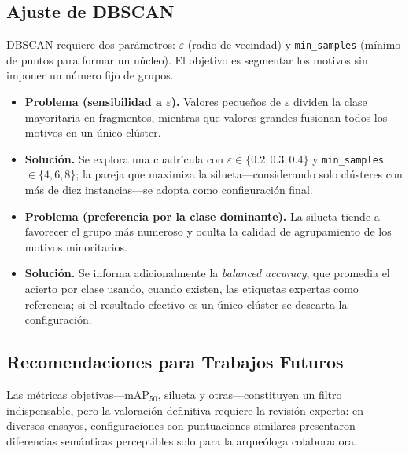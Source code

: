 \subsection{Ajuste de DBSCAN}\label{ssec:dbscan}

DBSCAN requiere dos parámetros: \(\varepsilon\) (radio de vecindad) y \texttt{min\_samples} (mínimo de puntos para formar un núcleo).
El objetivo es segmentar los motivos sin imponer un número fijo de grupos.

\begin{itemize}
  \item \textbf{Problema (sensibilidad a \(\varepsilon\)).}
        Valores pequeños de \(\varepsilon\) dividen la clase mayoritaria en fragmentos, mientras que valores grandes fusionan todos los motivos en un único clúster.
  \item \textbf{Solución.}
        Se explora una cuadrícula con \(\varepsilon\in\{0.2,0.3,0.4\}\) y \texttt{min\_samples}\(\in\{4,6,8\}\); la pareja que maximiza la silueta—considerando solo clústeres con más de diez instancias—se adopta como configuración final.

  \item \textbf{Problema (preferencia por la clase dominante).}
        La silueta tiende a favorecer el grupo más numeroso y oculta la calidad de agrupamiento de los motivos minoritarios.
  \item \textbf{Solución.}
        Se informa adicionalmente la \emph{balanced accuracy}, que promedia el acierto por clase usando, cuando existen, las etiquetas expertas como referencia; si el resultado efectivo es un único clúster se descarta la configuración.
\end{itemize}

\subsection{Recomendaciones para Trabajos Futuros}

Las métricas objetivas—\(\text{mAP}_{50}\), silueta y otras—constituyen un filtro indispensable, pero la valoración definitiva requiere la revisión experta: en diversos ensayos, configuraciones con puntuaciones similares presentaron diferencias semánticas perceptibles solo para la arqueóloga colaboradora.

